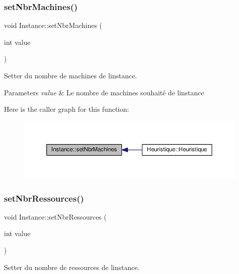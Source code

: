 \subsubsection{\texorpdfstring{set\+Nbr\+Machines()}{setNbrMachines()}}
{\footnotesize\ttfamily void Instance\+::set\+Nbr\+Machines (\begin{DoxyParamCaption}\item[{int}]{value }\end{DoxyParamCaption})}



Setter du nombre de machines de l\textquotesingle{}instance. 


\begin{DoxyParams}{Parameters}
{\em value} & Le nombre de machines souhaité de l\textquotesingle{}instance \\
\hline
\end{DoxyParams}
Here is the caller graph for this function\+:\nopagebreak
\begin{figure}[H]
\begin{center}
\leavevmode
\includegraphics[width=350pt]{classInstance_a6f61185f5b1136ba9ab2f6f01c9410b5_icgraph}
\end{center}
\end{figure}
\mbox{\label{classInstance_a391acee96072e5ad7270ecdbe8231bd6}} 
\subsubsection{\texorpdfstring{set\+Nbr\+Ressources()}{setNbrRessources()}}
{\footnotesize\ttfamily void Instance\+::set\+Nbr\+Ressources (\begin{DoxyParamCaption}\item[{int}]{value }\end{DoxyParamCaption})}



Setter du nombre de ressources de l\textquotesingle{}instance. 


